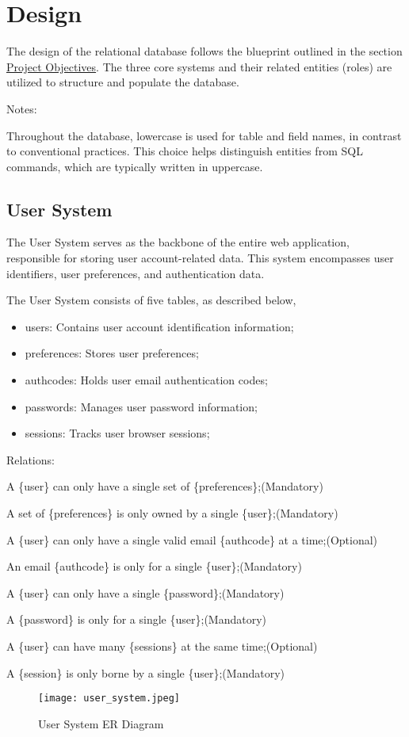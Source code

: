 \documentclass[12pt]{report}
\newcommand{\n}{\par}
\newcommand{\br}{\n\vspace{1 em}\n}
\begin{document}
\section{Design} \label{data-layer.design}
The design of the relational database follows the blueprint outlined in the section \hyperref[overview.project-objectives]{Project Objectives}.
The three core systems and their related entities (roles) are utilized to structure and populate the database.
\br
Notes:\n
Throughout the database, lowercase is used for table and field names, in contrast to conventional practices.
This choice helps distinguish entities from SQL commands, which are typically written in uppercase.
\subsection{User System} \label{data-layer.design.user-system}
The User System serves as the backbone of the entire web application, responsible for storing user account-related data.
This system encompasses user identifiers, user preferences, and authentication data.
\br
The User System consists of five tables, as described below,
\begin{itemize}
	\item users: Contains user account identification information;
	\item preferences: Stores user preferences;
	\item authcodes: Holds user email authentication codes;
	\item passwords: Manages user password information;
	\item sessions: Tracks user browser sessions;
\end{itemize}
Relations:\n
A \{user\} can only have a single set of \{preferences\};\null\hfill (Mandatory)\n
A set of \{preferences\} is only owned by a single \{user\};\null\hfill (Mandatory)
\br
A \{user\} can only have a single valid email \{authcode\} at a time;\null\hfill (Optional)\n
An email \{authcode\} is only for a single \{user\};\null\hfill (Mandatory)
\br
A \{user\} can only have a single \{password\};\null\hfill (Mandatory)\n
A \{password\} is only for a single \{user\};\null\hfill (Mandatory)
\br
A \{user\} can have many \{sessions\} at the same time;\null\hfill (Optional)\n
A \{session\} is only borne by a single \{user\};\null\hfill (Mandatory)
\begin{figure}[h]
	\centering
	\texttt{[image: user\_system.jpeg]}
	\caption{User System ER Diagram}
	\label{fig:user-system-er}
\end{figure}
\end{document}
